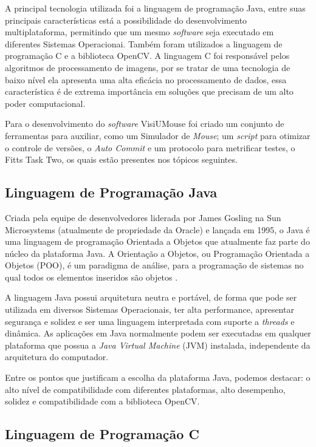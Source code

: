 A principal tecnologia utilizada foi a linguagem de programação Java, entre suas principais características está a possibilidade do desenvolvimento multiplataforma, permitindo que um mesmo \textit{software} seja executado em diferentes Sistemas Operacionai. Também foram utilizados a linguagem de programação C e a biblioteca OpenCV. A linguagem C foi responsável pelos algoritmos de processamento de imagens, por se tratar de uma tecnologia de baixo nível ela apresenta uma alta eficácia no processamento de dados, essa característica é de extrema importância em soluções que precisam de um alto poder computacional.

Para o desenvolvimento do \textit{software} VisiUMouse foi criado um conjunto de ferramentas para auxiliar, como um Simulador de \textit{Mouse}; um \textit{script} para otimizar o controle de versões, o \textit{Auto Commit} e um protocolo para metrificar testes, o Fitts Task Two, os quais estão presentes nos tópicos seguintes.

\subsection{Linguagem de Programação Java}

Criada pela equipe de desenvolvedores liderada por James Gosling na Sun Microsystems (atualmente de propriedade da Oracle) e lançada em 1995, o Java é uma linguagem de programação Orientada a Objetos que atualmente faz parte do núcleo da plataforma Java. A Orientação a Objetos, ou Programação Orientada a Objetos (POO), é um paradigma de análise, para a programação de sistemas no qual todos os elementos inseridos são objetos \cite{urma2014java}.

A linguagem Java possui arquitetura neutra e portável, de forma que pode ser utilizada em diversos Sistemas Operacionais, ter alta performance, apresentar segurança e solidez e ser uma linguagem interpretada com suporte a \textit{threads} e dinâmica. As aplicações em Java normalmente podem ser executadas em qualquer plataforma que possua a \textit{Java Virtual Machine} (JVM) instalada, independente da arquitetura do computador.

Entre os pontos que justificam a escolha da plataforma Java, podemos destacar: o alto nível de compatibilidade com diferentes plataformas, alto desempenho, solidez e compatibilidade com a biblioteca OpenCV.

\subsection{Linguagem de Programação C}

